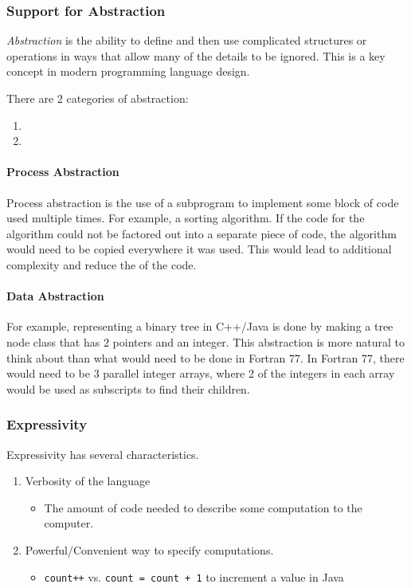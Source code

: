 \subsubsection{Support for Abstraction}\label{subsubsec:Abstraction_Support}
\begin{definition}[Abstraction]\label{def:Abstraction}
  \emph{Abstraction} is the ability to define and then use complicated structures or operations in ways that allow many of the details to be ignored.
  This is a key concept in modern programming language design.

  There are 2 categories of abstraction:
  \begin{enumerate}[noitemsep]
  \item {}
  \item {}
  \end{enumerate}
\end{definition}

\paragraph{Process Abstraction}\label{par:Process_Abstraction}
Process abstraction is the use of a subprogram to implement some block of code used multiple times.
For example, a sorting algorithm.
If the code for the algorithm could not be factored out into a separate piece of code, the algorithm would need to be copied everywhere it was used.
This would lead to additional complexity and reduce the  of the code.

\paragraph{Data Abstraction}\label{par:Data_Abstraction}
For example, representing a binary tree in C++/Java is done by making a tree node class that has 2 pointers and an integer.
This abstraction is more natural to think about than what would need to be done in Fortran 77.
In Fortran 77, there would need to be 3 parallel integer arrays, where 2 of the integers in each array would be used as subscripts to find their children.

\subsubsection{Expressivity}\label{subsubsec:Expressivity}
Expressivity has several characteristics.
\begin{enumerate}[noitemsep]
\item Verbosity of the language
  \begin{itemize}[noitemsep]
  \item The amount of code needed to describe some computation to the computer.
  \end{itemize}
\item Powerful/Convenient way to specify computations.
  \begin{itemize}[noitemsep]
  \item \texttt{count++} vs. \texttt{count = count + 1} to increment a value in Java
  \end{itemize}
\end{enumerate}

